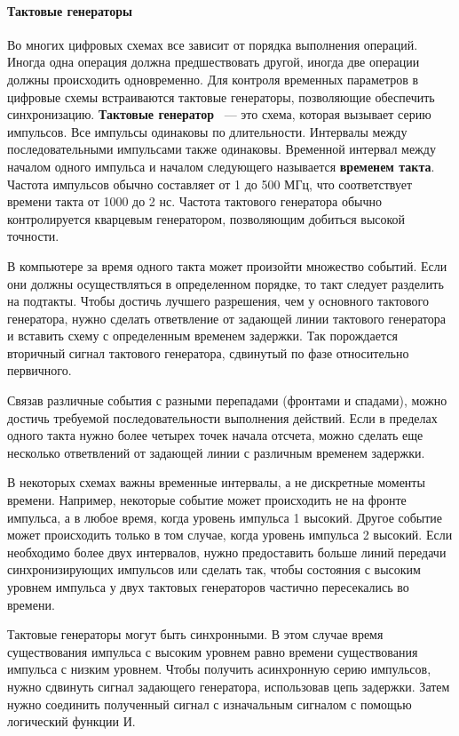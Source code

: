 \documentclass[10pt]{article}
\begin{document}
	\paragraph{Тактовые генераторы}
	Во многих цифровых схемах все зависит от порядка выполнения операций. Иногда одна операция должна предшествовать другой, иногда две операции должны происходить одновременно. Для контроля временных параметров в цифровые схемы встраиваются тактовые генераторы, позволяющие обеспечить синхронизацию. \textbf{Тактовые генератор} ~--- это схема, которая вызывает серию импульсов. Все импульсы одинаковы по длительности. Интервалы между последовательными импульсами также одинаковы. Временной интервал между началом одного импульса и началом следующего называется \textbf{временем такта}. Частота импульсов обычно составляет от 1 до 500 МГц, что соответствует времени такта от 1000 до 2 нс. Частота тактового генератора обычно контролируется кварцевым генератором, позволяющим добиться высокой точности.

	В компьютере за время одного такта может произойти множество событий. Если они должны осуществляться в определенном порядке, то такт следует разделить на подтакты. Чтобы достичь лучшего разрешения, чем у основного тактового генератора, нужно сделать ответвление от задающей линии тактового генератора и вставить схему с определенным временем задержки. Так порождается вторичный сигнал тактового генератора, сдвинутый по фазе относительно первичного.

	Связав различные события с разными перепадами (фронтами и спадами), можно достичь требуемой последовательности выполнения действий. Если в пределах одного такта нужно более четырех точек начала отсчета, можно сделать еще несколько ответвлений от задающей линии с различным временем задержки.

	В некоторых схемах важны временные интервалы, а не дискретные моменты времени. Например, некоторые событие может происходить не на фронте импульса, а в любое время, когда уровень импульса 1 высокий. Другое событие может происходить только в том случае, когда уровень импульса 2 высокий. Если необходимо более двух интервалов, нужно предоставить больше линий передачи синхронизирующих импульсов или сделать так, чтобы состояния с высоким уровнем импульса у двух тактовых генераторов частично пересекались во времени.

	Тактовые генераторы могут быть синхронными. В этом случае время существования импульса с высоким уровнем равно времени существования импульса с низким уровнем. Чтобы получить асинхронную серию импульсов, нужно сдвинуть сигнал задающего генератора,  использовав цепь задержки. Затем нужно соединить полученный сигнал с изначальным сигналом с помощью логический функции И.
\end{document}
